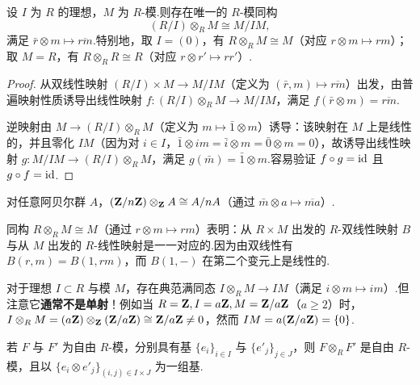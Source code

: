 \begin{theorem}\label{thm:quotient-tensor-m}
设 $I$ 为 $R$ 的理想，$M$ 为 $R$-模.则存在唯一的 $R$-模同构
\[
  (R/I) \otimes_R M \cong M/IM,
\]
满足 $\bar{r} \otimes m \mapsto \overline{rm}$.特别地，取 $I = (0)$，有 $R \otimes_R M \cong M$（对应 $r \otimes m \mapsto rm$）；取 $M = R$，有 $R \otimes_R R \cong R$（对应 $r \otimes r' \mapsto rr'$）.
\end{theorem}

\begin{proof}
从双线性映射 $(R/I) \times M \to M/IM$（定义为 $(\bar{r}, m) \mapsto \overline{rm}$）出发，由普遍映射性质诱导出线性映射 $f \colon (R/I) \otimes_R M \to M/IM$，满足 $f(\bar{r} \otimes m) = \overline{rm}$.

逆映射由 $M \to (R/I) \otimes_R M$（定义为 $m \mapsto \bar{1} \otimes m$）诱导：该映射在 $M$ 上是线性的，并且零化 $IM$（因为对 $i \in I$，$\bar{1} \otimes im = \bar{i} \otimes m = \bar{0} \otimes m = 0$），故诱导出线性映射 $g \colon M/IM \to (R/I) \otimes_R M$，满足 $g(\bar{m}) = \bar{1} \otimes m$.容易验证 $f \circ g = \operatorname{id}$ 且 $g \circ f = \operatorname{id}$.
\end{proof}

\begin{example}\label{ex:an-a}
对任意阿贝尔群 $A$，$(\mathbf{Z}/n\mathbf{Z}) \otimes_{\mathbf{Z}} A \cong A/nA$（通过 $\bar{m} \otimes a \mapsto \overline{ma}$）.
\end{example}

\begin{remark}\label{rem:r-tensor-m}
同构 $R \otimes_R M \cong M$（通过 $r \otimes m \mapsto rm$）表明：从 $R \times M$ 出发的 $R$-双线性映射 $B$ 与从 $M$ 出发的 $R$-线性映射是一一对应的.因为由双线性有 $B(r, m) = B(1, rm)$，而 $B(1, -)$ 在第二个变元上是线性的.
\end{remark}

\begin{remark}\label{rem:ideal-mult-map}
对于理想 $I \subset R$ 与模 $M$，存在典范满同态 $I \otimes_R M \to IM$（满足 $i \otimes m \mapsto im$）.但注意它\textbf{通常不是单射}！例如当 $R = \mathbf{Z}, I = a\mathbf{Z}, M = \mathbf{Z}/a\mathbf{Z}$（$a \geq 2$）时，$I \otimes_R M = (a\mathbf{Z}) \otimes_{\mathbf{Z}} (\mathbf{Z}/a\mathbf{Z}) \cong \mathbf{Z}/a\mathbf{Z} \neq 0$，然而 $IM = a(\mathbf{Z}/a\mathbf{Z}) = \{0\}$.
\end{remark}

\begin{theorem}\label{thm:free-tensor-basis}
若 $F$ 与 $F'$ 为自由 $R$-模，分别具有基 $\{e_i\}_{i \in I}$ 与 $\{e'_j\}_{j \in J}$，则 $F \otimes_R F'$ 是自由 $R$-模，且以 $\{e_i \otimes e'_j\}_{(i, j) \in I \times J}$ 为一组基.
\end{theorem}

